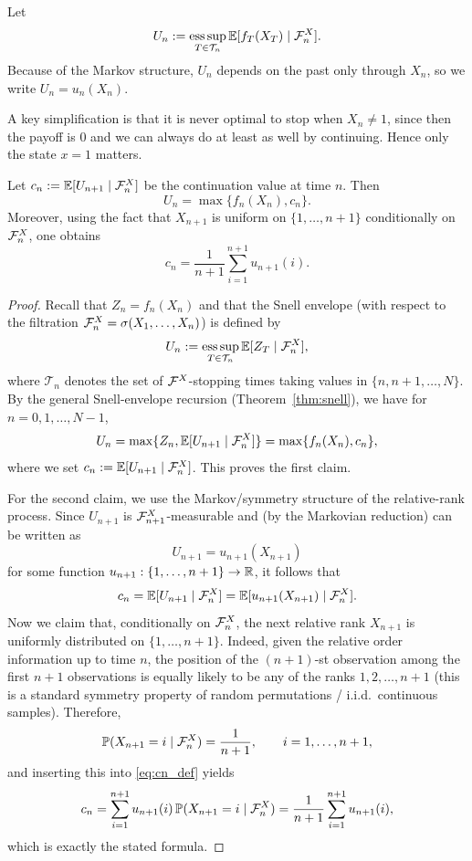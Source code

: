 Let
\[
U_n := \operatorname*{ess\,sup}_{T\in\mathcal{T}_n}\mathbb{E}[f_T(X_T)\mid \mathcal{F}_n^X].
\]
Because of the Markov structure, $U_n$ depends on the past only through $X_n$, so we write
$U_n = u_n(X_n)$.

A key simplification is that it is never optimal to stop when $X_n\ne 1$, since then the payoff is $0$
and we can always do at least as well by continuing. Hence only the state $x=1$ matters.

\begin{lemma}\label{lem:sec_rec}
Let $c_n:=\mathbb{E}[U_{n+1}\mid \mathcal{F}_n^X]$ be the continuation value at time $n$. Then
\[
U_n = \max\{f_n(X_n),c_n\}.
\]
Moreover, using the fact that $X_{n+1}$ is uniform on $\{1,\dots,n+1\}$ conditionally on $\mathcal{F}_n^X$, one obtains
\[
c_n = \frac{1}{n+1}\sum_{i=1}^{n+1} u_{n+1}(i).
\]
\end{lemma}

\begin{proof}
Recall that $Z_n=f_n(X_n)$ and that the Snell envelope (with respect to the filtration
$\mathcal{F}_n^X=\sigma(X_1,\dots,X_n)$) is defined by
\[
U_n:=\operatorname*{ess\,sup}_{T\in\mathcal{T}_n}\mathbb{E}[Z_T\mid \mathcal{F}_n^X],
\]
where $\mathcal{T}_n$ denotes the set of $\mathcal{F}^X$-stopping times taking values in $\{n,n+1,\dots,N\}$.
By the general Snell-envelope recursion (Theorem~\ref{thm:snell}), we have for $n=0,1,\dots,N-1$,
\begin{equation}\label{eq:snell_sec}
U_n=\max\{Z_n,\mathbb{E}[U_{n+1}\mid \mathcal{F}_n^X]\}
=\max\{f_n(X_n),c_n\},
\end{equation}
where we set $c_n:=\mathbb{E}[U_{n+1}\mid \mathcal{F}_n^X]$. This proves the first claim.

\medskip
For the second claim, we use the Markov/symmetry structure of the relative-rank process.
Since $U_{n+1}$ is $\mathcal{F}_{n+1}^X$-measurable and (by the Markovian reduction) can be written as
\[
U_{n+1}=u_{n+1}(X_{n+1})
\]
for some function $u_{n+1}:\{1,\dots,n+1\}\to\mathbb{R}$, it follows that
\begin{equation}\label{eq:cn_def}
c_n=\mathbb{E}[U_{n+1}\mid \mathcal{F}_n^X]=\mathbb{E}[u_{n+1}(X_{n+1})\mid \mathcal{F}_n^X].
\end{equation}
Now we claim that, conditionally on $\mathcal{F}_n^X$, the next relative rank $X_{n+1}$ is uniformly distributed
on $\{1,\dots,n+1\}$. Indeed, given the relative order information up to time $n$, the position of the
$(n+1)$-st observation among the first $n+1$ observations is equally likely to be any of the ranks
$1,2,\dots,n+1$ (this is a standard symmetry property of random permutations / i.i.d.\ continuous samples).
Therefore,
\[
\mathbb{P}(X_{n+1}=i\mid \mathcal{F}_n^X)=\frac{1}{n+1},\qquad i=1,\dots,n+1,
\]
and inserting this into \eqref{eq:cn_def} yields
\[
c_n
=\sum_{i=1}^{n+1} u_{n+1}(i)\,\mathbb{P}(X_{n+1}=i\mid \mathcal{F}_n^X)
=\frac{1}{n+1}\sum_{i=1}^{n+1}u_{n+1}(i),
\]
which is exactly the stated formula.
\end{proof}


